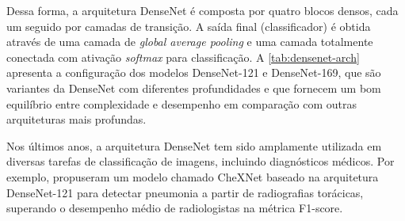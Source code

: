 Dessa forma, a arquitetura DenseNet é composta por quatro blocos densos, cada um seguido por camadas de transição. A saída final (classificador) é obtida através de uma camada de \textit{global average pooling} e uma camada totalmente conectada com ativação \textit{softmax} para classificação. A \autoref{tab:densenet-arch} apresenta a configuração dos modelos DenseNet-121 e DenseNet-169, que são variantes da DenseNet com diferentes profundidades e que fornecem um bom equilíbrio entre complexidade e desempenho em comparação com outras arquiteturas mais profundas.

Nos últimos anos, a arquitetura DenseNet tem sido amplamente utilizada em diversas tarefas de classificação de imagens, incluindo diagnósticos médicos. Por exemplo, \cite{Rajpurkar2017} propuseram um modelo chamado CheXNet baseado na arquitetura DenseNet-121 para detectar pneumonia a partir de radiografias torácicas, superando o desempenho médio de radiologistas na métrica F1-score.

